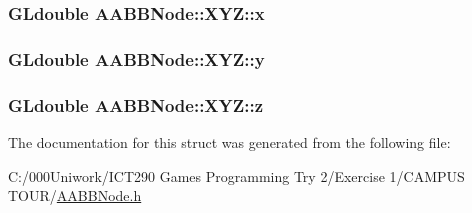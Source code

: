 \subsubsection[{\texorpdfstring{x}{x}}]{\setlength{\rightskip}{0pt plus 5cm}G\+Ldouble A\+A\+B\+B\+Node\+::\+X\+Y\+Z\+::x}\hypertarget{struct_a_a_b_b_node_1_1_x_y_z_acae492ce70ffac4fadc0ac896e6eb3dd}{}\label{struct_a_a_b_b_node_1_1_x_y_z_acae492ce70ffac4fadc0ac896e6eb3dd}
\subsubsection[{\texorpdfstring{y}{y}}]{\setlength{\rightskip}{0pt plus 5cm}G\+Ldouble A\+A\+B\+B\+Node\+::\+X\+Y\+Z\+::y}\hypertarget{struct_a_a_b_b_node_1_1_x_y_z_aabe6ebb872838d5d7cd6f9535be750bb}{}\label{struct_a_a_b_b_node_1_1_x_y_z_aabe6ebb872838d5d7cd6f9535be750bb}
\subsubsection[{\texorpdfstring{z}{z}}]{\setlength{\rightskip}{0pt plus 5cm}G\+Ldouble A\+A\+B\+B\+Node\+::\+X\+Y\+Z\+::z}\hypertarget{struct_a_a_b_b_node_1_1_x_y_z_a5bde4ccc9a39dc20ede833ed64b51015}{}\label{struct_a_a_b_b_node_1_1_x_y_z_a5bde4ccc9a39dc20ede833ed64b51015}


The documentation for this struct was generated from the following file\+:\begin{DoxyCompactItemize}
\item 
C\+:/000\+Uniwork/\+I\+C\+T290 Games Programming Try 2/\+Exercise 1/\+C\+A\+M\+P\+U\+S T\+O\+U\+R/\hyperlink{_a_a_b_b_node_8h}{A\+A\+B\+B\+Node.\+h}\end{DoxyCompactItemize}
